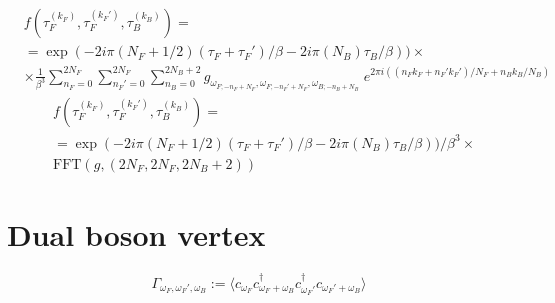 \documentclass[11pt]{article}
\begin{document}
\begin{equation}\label{}
  \begin{split}
  &f(\tau_F^{(k_F)}, \tau_F^{(k_F')}, \tau_B^{(k_B)})=\\
      &=\exp(-2i\pi(N_F+1/2)(\tau_F+\tau_F')/\beta
    -2i\pi(N_B)\tau_B/\beta)
    )\times \\
    &\times\frac{1}{ \beta ^ 3}\sum_{n_F=0}^{
  2N_F} \sum_{n_F'=0}^{ 2N_F}\sum_{n_B=0}^{2N_B+2} g_{ \omega_{F;-n_F + N_F},
      \omega_{F;-n_F' + N_F}, \omega_{B; -n_B + N_B }}\;
    e^{2\pi i
      ((n_F k_F+n_F' k_F')/N_F+n_B k_B/N_B)}
    \end{split}
\end{equation}
\begin{equation}\label{}
  \begin{split}
  &f(\tau_F^{(k_F)}, \tau_F^{(k_F')}, \tau_B^{(k_B)})=\\
      &=\exp(-2i\pi(N_F+1/2)(\tau_F+\tau_F')/\beta
    -2i\pi(N_B)\tau_B/\beta)
    )/\beta^3\times \\
&\text{FFT}(g, (2N_F, 2N_F, 2N_B+2))
    \end{split}
\end{equation}

\section{Dual boson vertex}
\begin{equation}\label{}
\Gamma_{\omega_F,\omega_F',\omega_B} :=\langle c_{\omega_F} c^\dagger_{\omega_F+\omega_B}
c^\dagger_{\omega_F'}c_{\omega_F'+\omega_B}\rangle
\end{equation}
\end{document}
